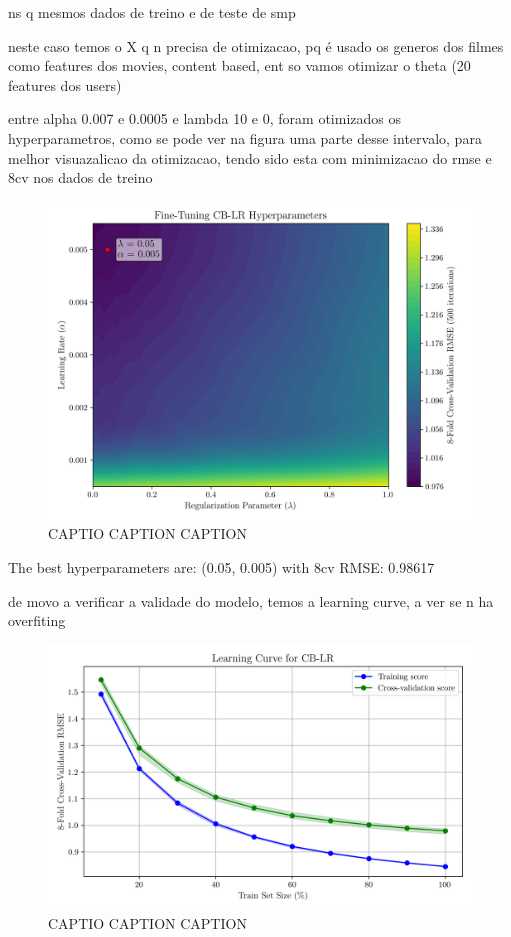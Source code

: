 \documentclass[conference]{IEEEtran}
\begin{document}
ns q mesmos dados de treino e de teste de smp

neste caso temos o X q n precisa de otimizacao, pq é usado os generos dos filmes como features dos movies, content based, ent so vamos otimizar o theta (20 features dos users)

entre alpha 0.007 e 0.0005 e lambda 10 e 0, foram otimizados os hyperparametros, como se pode ver na figura uma parte desse intervalo, para melhor visuazalicao da otimizacao, tendo sido esta com minimizacao do rmse e 8cv nos dados de treino

\begin{figure}[H]
    \centering
    \includegraphics[width=1\linewidth]{assets/model02_hyperparemeterstunning.png}
    \caption{CAPTIO CAPTION CAPTION}
    \label{fig:model02_hyperparemeterstunning}
\end{figure}

The best hyperparameters are: (0.05, 0.005) with 8cv RMSE: 0.98617


de movo a verificar a validade do modelo, temos a learning curve, a ver se n ha overfiting

\begin{figure}[H]
    \centering
    \includegraphics[width=1\linewidth]{assets/model02_learning_curve.png}
    \caption{CAPTIO CAPTION CAPTION}
    \label{fig:model02_learning_curve}
\end{figure}
\end{document}
